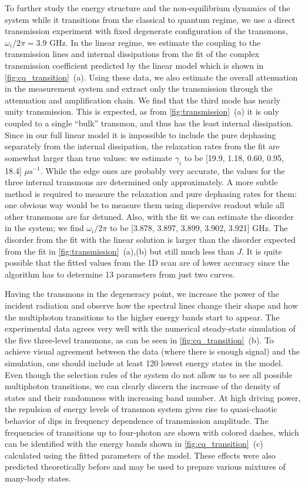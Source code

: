 \documentclass[%
 aps, pra,
 amsmath,amssymb,
 reprint,%
superscriptaddress
]{revtex4-2}
\begin{document}
To further study the energy structure and the non-equilibrium dynamics of the system while it transitions from the classical to quantum regime, we use a direct transmission experiment with fixed degenerate configuration of the transmons, $\omega_i/2\pi = 3.9$ GHz. In the linear regime, we estimate the coupling to the transmission lines and internal dissipations from the fit of the complex transmission coefficient predicted by the linear model which is shown in \autoref{fig:cq_transition}~(a). Using these data, we also estimate the overall attenuation in the measurement system and extract only the transmission through the attenuation and amplification chain. We find that the third mode has nearly unity transmission. This is expected, as from \autoref{fig:transmission}~(a) it is only coupled to a single ``bulk'' transmon, and thus has the least internal dissipation. Since in our full linear model it is impossible to include the pure dephasing separately from the internal dissipation, the relaxation rates from the fit are somewhat larger than true values: we estimate $\gamma_i$ to be [19.9, 1.18, 0.60, 0.95, 18.4] $\mu\text{s}^{-1}$. While the edge ones are probably very accurate, the values for the three internal transmons are determined only approximately. A more subtle method is required to measure the relaxation and pure dephasing rates for them: one obvious way would be to measure them using dispersive readout while all other transmons are far detuned. Also, with the fit we can estimate the disorder in the system; we find $\omega_i/2\pi$ to be [3.878, 3.897, 3.899, 3.902, 3.921] GHz. The disorder from the fit with the linear solution is larger than the disorder expected from the fit in \autoref{fig:transmission}~(a),(b) but still much less than $J$. It is quite possible that the fitted values from the 1D scan are of lower accuracy since the algorithm has to determine 13 parameters from just two curves.

Having the transmons in the degeneracy point, we increase the power of the incident radiation and observe how the spectral lines change their shape and how the multiphoton transitions to the higher energy bands start to appear. The experimental data agrees very well with the numerical steady-state simulation of the five three-level transmons, as can be seen in \autoref{fig:cq_transition}~(b). To achieve visual agreement between the data (where there is enough signal) and the simulation, one should include at least 120 lowest energy states in the model.  Even though the selection rules of the system do not allow us to see all possible multiphoton transitions, we can clearly discern the increase of the density of states and their randomness with increasing band number. At high driving power, the repulsion of energy levels of transmon system gives rise to quasi-chaotic behavior of dips in frequency dependence of transmission amplitude. The frequencies of transitions up to four-photon are shown with colored dashes, which can be identified with the energy bands shown in \autoref{fig:cq_transition}~(c) calculated using the fitted parameters of the model. These effects were also predicted theoretically before \cite{Biella2015} and may be used to prepare various mixtures of many-body states.
\end{document}
